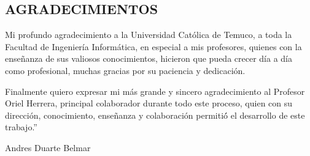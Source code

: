 \thispagestyle{empty}
\begin{titlepage}
\begin{center}
\section*{AGRADECIMIENTOS}
\end{center}


\begin{flushleft}

Mi profundo agradecimiento a la Universidad Católica de Temuco, a toda la Facultad de Ingeniería Informática, en especial a mis profesores, quienes con la enseñanza de sus valiosos conocimientos, hicieron que pueda crecer día a día como profesional, muchas gracias por su paciencia y dedicación.

\hfill

Finalmente quiero expresar mi más grande y sincero agradecimiento al Profesor Oriel Herrera, principal colaborador durante todo este proceso, quien con su dirección, conocimiento, enseñanza y colaboración permitió́ el desarrollo de este trabajo.”

\end{flushleft}

\hfill

\begin{flushright}

Andres Duarte Belmar

\end{flushright}

\end{titlepage}